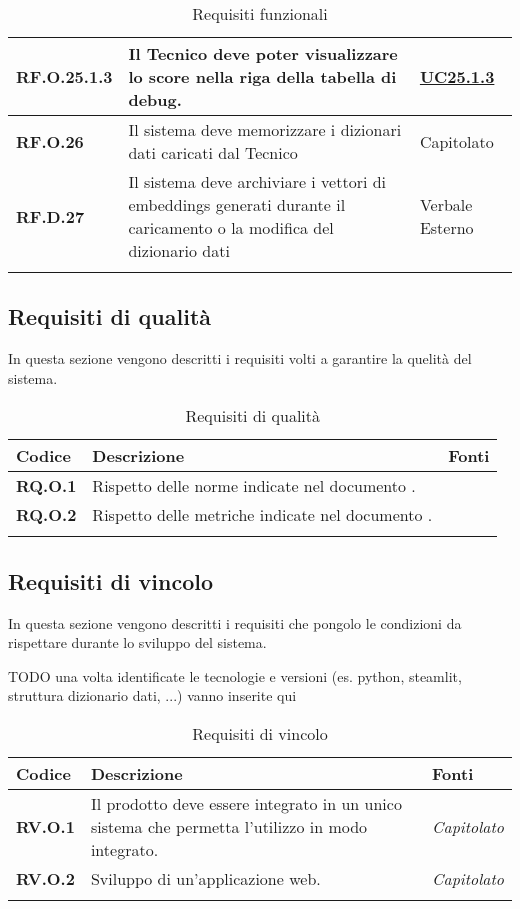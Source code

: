 \begin{longtable}{|P{3cm}|P{6,5cm}|>{\arraybackslash}P{4cm}|}
    \hline
    \textbf{RF.O.25.1.3} & Il Tecnico deve poter visualizzare lo score nella riga della tabella di debug. &  \hyperref[UC25poin1point3]{UC25.1.3}\\
    \hline
    \textbf{RF.O.26} & Il sistema deve memorizzare i dizionari dati caricati dal Tecnico & Capitolato\\
    \hline
    \textbf{RF.D.27} & Il sistema deve archiviare i vettori di embeddings generati durante il caricamento o la modifica del dizionario dati & Verbale Esterno\\
    \hline
\caption{Requisiti funzionali}
\label{requisitifunzionali}
\end{longtable}

\subsection{Requisiti di qualità}
In questa sezione vengono descritti i requisiti volti a garantire la quelità del sistema.

\begin{longtable}{|P{3cm}|P{6,5cm}|>{\arraybackslash}P{4cm}|}
  \hline
  \textbf{Codice} & \textbf{Descrizione} & \textbf{Fonti} \\
  \hline
  \textbf{RQ.O.1} & Rispetto delle norme indicate nel documento \NdP{}. & \NdP{} \\
  \hline
  \textbf{RQ.O.2} & Rispetto delle metriche indicate nel documento \PdQ{}. & \NdP{} \\
  \hline
\caption{Requisiti di qualità}
\label{requisitiqualita}
\end{longtable}

\subsection{Requisiti di vincolo}
In questa sezione vengono descritti i requisiti che pongolo le condizioni da rispettare durante lo sviluppo del sistema.

TODO una volta identificate le tecnologie e versioni (es. python, steamlit, struttura dizionario dati, ...) vanno inserite qui
\begin{longtable}{|P{3cm}|P{6,5cm}|>{\arraybackslash}P{4cm}|}
  \hline
  \textbf{Codice} & \textbf{Descrizione} & \textbf{Fonti} \\
  \hline
  \textbf{RV.O.1} & Il prodotto deve essere integrato in un unico sistema che permetta l'utilizzo in modo integrato. & \emph{Capitolato} \\
  \hline
  \textbf{RV.O.2} & Sviluppo di un'applicazione web. & \emph{Capitolato} \\
  \hline
\caption{Requisiti di vincolo}
\label{requisitivincolo}
\end{longtable}

